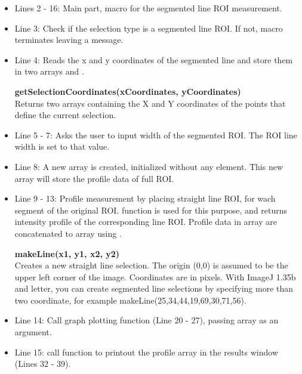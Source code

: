\begin{itemize}
\item Lines 2 - 16: Main part, macro for the segmented line ROI measurement.  

\item Line 3: Check if the selection type is a segmented line ROI. If not, macro
terminates leaving a message.

\item Line 4: Reads the x and y coordinates of the segmented line
and store them in two arrays  and .

\begin{indentCom}
\textbf{getSelectionCoordinates(xCoordinates, yCoordinates)}\\
Returns two arrays containing the X and Y coordinates of the points that define the current selection. 
\end{indentCom}

\item Line 5 - 7: Asks the user to input width of the segmented ROI. The ROI
line width is set to that value.

\item Line 8: A new array  is created, initialized without
any element. This new array will store the profile data of full ROI.

\item Line 9 - 13: Profile measurement by placing straight line ROI,
for wach segment of the original ROI.  function is used for this
purpose, and  returns intensity profile of the corresponding
line ROI. Profile data in  array are concatenated to
 array using .

\begin{indentCom}
\textbf{makeLine(x1, y1, x2, y2)}\\
Creates a new straight line selection. The origin (0,0) is assumed to be the upper left corner of the image. Coordinates are in pixels. With ImageJ 1.35b and letter, you can create segmented line selections by specifying more than two coordinate, for example makeLine(25,34,44,19,69,30,71,56).
\end{indentCom}

\item Line 14: Call graph plotting function (Line 20 - 27), passing
 array as an argument.

\item Line 15: call function to printout the profile array in the results window
(Lines 32 - 39).


\end{itemize}
